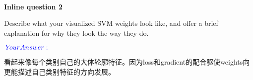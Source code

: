 \documentclass[11pt]{article}
\begin{document}
    \begin{center}
    \end{center}
    { \hspace*{\fill} \\}
    
    \textbf{Inline question 2}

Describe what your visualized SVM weights look like, and offer a brief
explanation for why they look the way they do.

\(\color{blue}{\textit Your Answer:}\)

看起来像每个类别自己的大体轮廓特征。因为loss和gradient的配合驱使weights向更能描述自己类别特征的方向发展。


    
    
    
\end{document}
